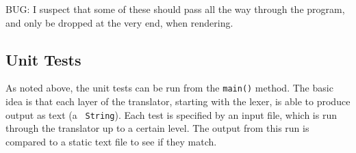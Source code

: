 \documentclass[titlepage,oneside,10pt]{article}
\begin{document}
BUG: I suspect that some of these should pass all the way through the
program, and only be dropped at the very end, when rendering.

\subsection{Unit Tests}

As noted above, the unit tests can be run from the {\tt main()}
method. The basic idea is that each layer of the translator, starting
with the lexer, is able to produce output as text (a {\tt
  String}). Each test is specified by an input file, which is run
through the translator up to a certain level. The output from this run
is compared to a static text file to see if they match.
\end{document}
